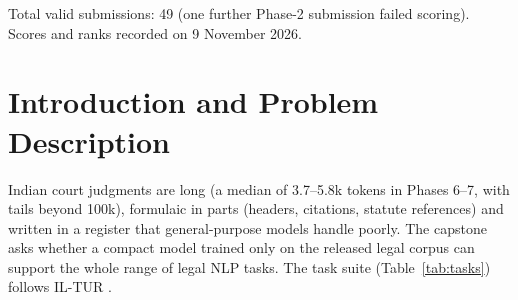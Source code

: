 \documentclass[11pt]{article}
\begin{document}
\begin{table}[H]
\centering\small
\caption{Official leaderboard results (best submission per phase).}
\label{tab:leaderboard}
\end{table}
\noindent Total valid submissions: 49 (one further Phase-2 submission failed scoring). \qquad Scores and ranks recorded on 9 November 2026.

\section{Introduction and Problem Description}
\label{sec:intro}
Indian court judgments are long (a median of 3.7--5.8k tokens in Phases 6--7, with tails beyond 100k), formulaic in parts (headers, citations, statute references) and written in a register that general-purpose models handle poorly. The capstone asks whether a compact model trained only on the released legal corpus can support the whole range of legal NLP tasks. The task suite (Table~\ref{tab:tasks}) follows IL-TUR \cite{joshi2024ilTUR}.
\end{document}
